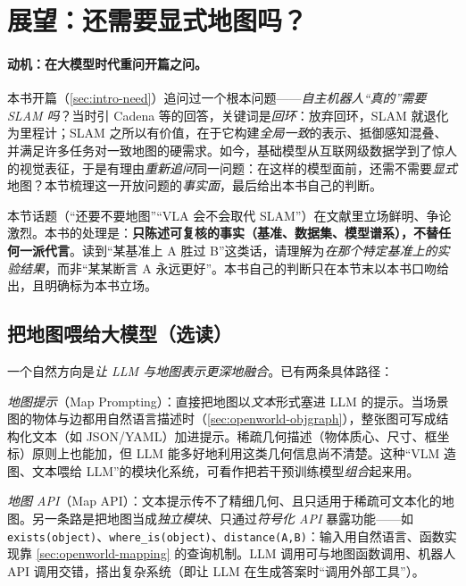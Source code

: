 \section{展望：还需要显式地图吗？}
\label{sec:openworld-future}

\paragraph{动机：在大模型时代重问开篇之问。}
本书开篇（\cref{sec:intro-need}）追问过一个根本问题——\emph{自主机器人“真的”需要 SLAM 吗}？当时引 Cadena 等的回答，关键词是\emph{回环}：放弃回环，SLAM 就退化为里程计；SLAM 之所以有价值，在于它构建\emph{全局一致}的表示、抵御感知混叠、并满足许多任务对一致地图的硬需求。如今，基础模型从互联网级数据学到了惊人的视觉表征，于是有理由\emph{重新追问}同一问题：在这样的模型面前，还需不需要\emph{显式}地图？本节梳理这一开放问题的\emph{事实面}，最后给出本书自己的判断。

\begin{note}
本节话题（“还要不要地图”“VLA 会不会取代 SLAM”）在文献里立场鲜明、争论激烈。本书的处理是：\textbf{只陈述可复核的事实（基准、数据集、模型谱系），不替任何一派代言}。读到“某基准上 A 胜过 B”这类话，请理解为\emph{在那个特定基准上的实验结果}，而非“某某断言 A 永远更好”。本书自己的判断只在本节末以本书口吻给出，且明确标为本书立场。
\end{note}

\subsection{把地图喂给大模型（选读）}
\label{sec:openworld-mapapi}

一个自然方向是\emph{让 LLM 与地图表示更深地融合}\cite{paull2026openworld}。已有两条具体路径：

\emph{地图提示}（Map Prompting）：直接把地图以\emph{文本}形式塞进 LLM 的提示。当场景图的物体与边都用自然语言描述时（\cref{sec:openworld-objgraph}），整张图可写成结构化文本（如 JSON/YAML）加进提示。稀疏几何描述（物体质心、尺寸、框坐标）原则上也能加，但 LLM 能多好地利用这类几何信息尚不清楚。这种“VLM 造图、文本喂给 LLM”的模块化系统，可看作把若干预训练模型\emph{组合}起来用。

\emph{地图 API}（Map API）：文本提示传不了精细几何、且只适用于稀疏可文本化的地图。另一条路是把地图当成\emph{独立模块}、只通过\emph{符号化 API} 暴露功能——如 \texttt{exists(object)}、\texttt{where\_is(object)}、\texttt{distance(A,B)}：输入用自然语言、函数实现靠 \cref{sec:openworld-mapping} 的查询机制。LLM 调用可与地图函数调用、机器人 API 调用交错，搭出复杂系统（即让 LLM 在生成答案时“调用外部工具”）。

